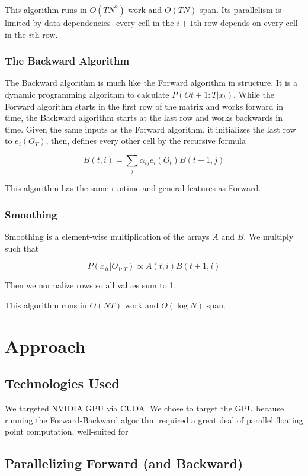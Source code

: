 \documentclass[12pt]{article}
\begin{document}
This algorithm runs in $O(TN^2)$ work and $O(TN)$ span.  Its parallelism is limited by data dependencies- every cell in the $i+1$th row depends on every cell in the $i$th row.

\subsubsection{The Backward Algorithm}

The Backward algorithm is much like the Forward algorithm in structure.  It is a dynamic programming algorithm to calculate $P(O{t+1:T} | x_t)$.  While the Forward algorithm starts in the first row of the matrix and works forward in time, the Backward algorithm starts at the last row and works backwards in time.  Given the same inputs as the Forward algorithm, it initializes the last row to $e_i(O_T)$, then, defines every other cell by the recursive formula 

$$ B(t, i) = \sum_j \alpha_{ij} e_i(O_t) B(t+1, j) $$

This algorithm has the same runtime and general features as Forward.

\subsubsection{Smoothing}

Smoothing is a element-wise multiplication of the arrays $A$ and $B$.  We multiply such that 

$$ P(x_{it} | O_{1:T}) \propto A(t, i)B(t+1,i) $$

Then we normalize rows so all values sum to 1.  

This algorithm runs in $O(NT)$ work and $O(\log N)$ span.  

\section{Approach}

\subsection{Technologies Used}

We targeted NVIDIA GPU via CUDA.  We chose to target the GPU because running the Forward-Backward algorithm required a great deal of parallel floating point computation, well-suited for %

\subsection{Parallelizing Forward (and Backward)}
\end{document}
